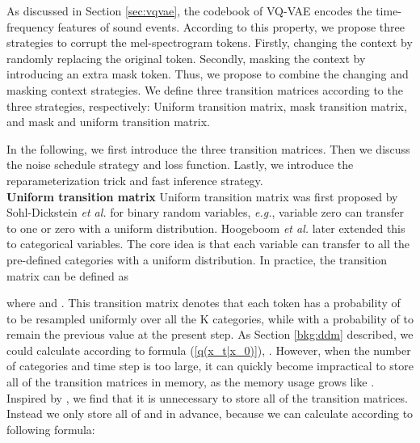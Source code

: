 \documentclass[lettersize,journal]{IEEEtran}
\begin{document}
As discussed in Section \ref{sec:vqvae}, the codebook of VQ-VAE encodes the time-frequency features of sound events. According to this property, we propose three strategies to corrupt the mel-spectrogram tokens. Firstly, changing the context by randomly replacing the original token. Secondly, masking the context by introducing an extra mask token. {} Thus, we propose to combine the changing and masking context strategies. We define three transition matrices according to the three strategies, respectively: Uniform transition matrix, mask transition matrix, and mask and uniform transition matrix.

In the following, we first introduce the three transition matrices. Then we discuss the noise schedule strategy and loss function. Lastly, we introduce the reparameterization trick and fast inference strategy.  \\
\noindent \textbf{Uniform transition matrix} Uniform transition matrix was first proposed by Sohl-Dickstein \textit{et al.} \cite{sohl2015deep} for binary random variables, \textit{e.g.}, variable zero can transfer to one or zero with a uniform distribution. Hoogeboom \textit{et al.} \cite{hoogeboom2021argmax} later extended this to categorical variables. The core idea is that each variable can transfer to all the pre-defined categories with a uniform distribution. In practice, the transition matrix  can be defined as
 
where  and . This transition matrix denotes that each token has a probability of  to be resampled uniformly over all the K categories, while with a probability of  to remain the previous value at the present step. 
As Section \ref{bkg:ddm} described, we could calculate  according to formula (\ref{q(x_t|x_0)}), . However, when the number of categories  and time step  is too large, it can quickly become impractical to store all of the transition matrices  in memory, as the memory usage grows like . Inspired by \cite{gu2021vector}, we find that it is unnecessary to store all of the transition matrices. Instead we only store all of  and  in advance, because we can calculate  according to following formula:
\end{document}
